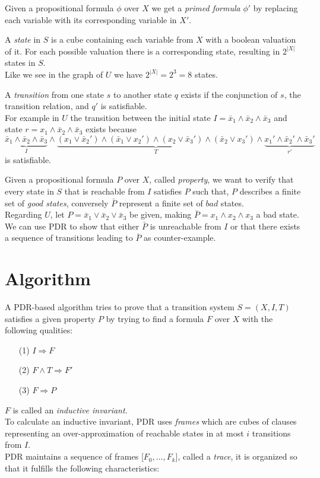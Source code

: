 \documentclass[11pt, a4paper, BCOR=10mm, ngerman, oneside]{scrbook}
\begin{document}
Given a propositional formula $\phi$ over $X$ we get a \textsl{primed formula} $\phi'$ by replacing each variable with its corresponding variable in $X'$. \par

A \textsl{state} in $S$ is a cube containing each variable from $X$ with a boolean valuation of it. For each possible valuation there is a corresponding state, resulting in $2^{|X|}$ states in $S$. \\
Like we see in the graph of $U$ we have $2^{|X|} = 2^3 = 8$ states.

A \textsl{transition} from one state $s$ to another state $q$ exists if the conjunction of $s$, the transition relation, and $q'$ is satisfiable.\\ For example in $U$ the transition between the initial state $I = \bar x_1 \land \bar x_2 \land \bar x_3$ and state $r = x_1 \land \bar x_2 \land \bar x_3$ exists because
\begin{equation*}
\underbrace{\bar x_1 \land \bar x_2 \land \bar x_3}_{I} \land \underbrace{(x_1 \lor \bar x_2' ) \land ( \bar x_1 \lor x_2') \land (x_2 \lor \bar x_3') \land ( \bar x_2 \lor x_3')}_T \land \underbrace{x_1' \land \bar x_2' \land \bar x_3'}_{r'}
\end{equation*}
is satisfiable.\par

Given a propositional formula $P$ over $X$, called \textsl{property}, we want
to verify that every state in $S$ that is reachable from
$I$ satisfies $P$ such that, $P$ describes a finite set of \textsl{good states}, conversely $\bar P$ represent a finite set of $bad$ states.  \\ 
Regarding $U$, let $P = \bar x_1 \lor \bar x_2 \lor \bar x_3$ be given, making $\bar P = x_1 \land x_2 \land x_3$ a bad state. \\ 
We can use PDR to show that either $\bar P$ is unreachable from $I$ or that there exists a sequence of transitions leading to $\bar P$ as counter-example.

\section{Algorithm}
A PDR-based algorithm tries to prove that a transition system $S = (X, I, T)$ satisfies a given property $P$ by trying to find a formula $F$ over $X$ with the following qualities:
\begin{itemize}
\item[(1)] $I \Rightarrow F$
\item[(2)] $F \land T \Rightarrow F'$
\item[(3)] $F \Rightarrow P$
\end{itemize}
$F$ is called an \textsl{inductive invariant}. \\ 
To calculate an inductive invariant, PDR uses \textsl{frames} which are cubes of clauses representing an over-approximation of reachable states in at most $i$ transitions from $I$. \\
PDR maintains a sequence of frames [$F_0, ..., F_k$], called a \textsl{trace}, it is organized so that it fulfills the following characteristics: 
\end{document}
